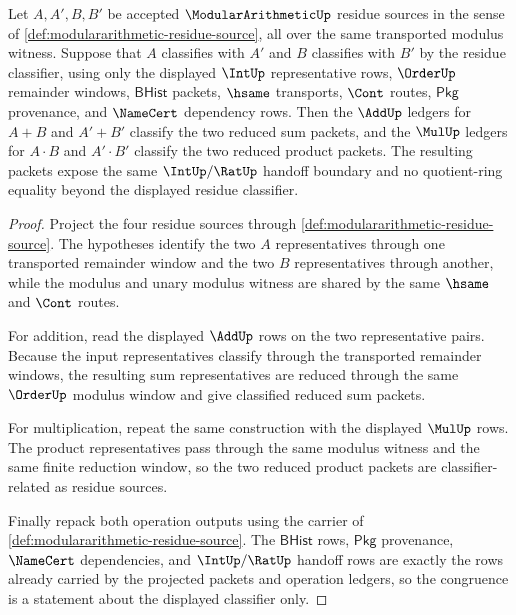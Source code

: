 \begin{theorem}
\label{thm:modulararithmetic-residue-operation-congruence}
Let $A,A',B,B'$ be accepted $\ModularArithmeticUp$ residue sources in the sense of \autoref{def:modulararithmetic-residue-source}, all over the same transported modulus witness. Suppose that $A$ classifies with $A'$ and $B$ classifies with $B'$ by the residue classifier, using only the displayed $\IntUp$ representative rows, $\OrderUp$ remainder windows, $\mathsf{BHist}$ packets, $\hsame$ transports, $\Cont$ routes, $\mathsf{Pkg}$ provenance, and $\NameCert$ dependency rows. Then the $\AddUp$ ledgers for $A+B$ and $A'+B'$ classify the two reduced sum packets, and the $\MulUp$ ledgers for $A\cdot B$ and $A'\cdot B'$ classify the two reduced product packets. The resulting packets expose the same $\IntUp/\RatUp$ handoff boundary and no quotient-ring equality beyond the displayed residue classifier.
\end{theorem}
\begin{proof}
Project the four residue sources through \autoref{def:modulararithmetic-residue-source}. The hypotheses identify the two $A$ representatives through one transported remainder window and the two $B$ representatives through another, while the modulus and unary modulus witness are shared by the same $\hsame$ and $\Cont$ routes.

For addition, read the displayed $\AddUp$ rows on the two representative pairs. Because the input representatives classify through the transported remainder windows, the resulting sum representatives are reduced through the same $\OrderUp$ modulus window and give classified reduced sum packets.

For multiplication, repeat the same construction with the displayed $\MulUp$ rows. The product representatives pass through the same modulus witness and the same finite reduction window, so the two reduced product packets are classifier-related as residue sources.

Finally repack both operation outputs using the carrier of \autoref{def:modulararithmetic-residue-source}. The $\mathsf{BHist}$ rows, $\mathsf{Pkg}$ provenance, $\NameCert$ dependencies, and $\IntUp/\RatUp$ handoff rows are exactly the rows already carried by the projected packets and operation ledgers, so the congruence is a statement about the displayed classifier only.
\end{proof}

